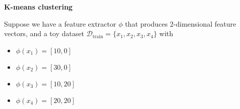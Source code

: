 \item {\bf K-means clustering}

Suppose we have a feature extractor $\phi$ that produces 2-dimensional feature
vectors, and a toy dataset $\mathcal D_\text{train} = \{x_1, x_2, x_3, x_4\}$
with
\begin{itemize}
  \item $\phi(x_1) = [10, 0]$
  \item $\phi(x_2) = [30, 0]$
  \item $\phi(x_3) = [10, 20]$
  \item $\phi(x_4) = [20, 20]$
\end{itemize}

\begin{enumerate}

  

  

\end{enumerate}
